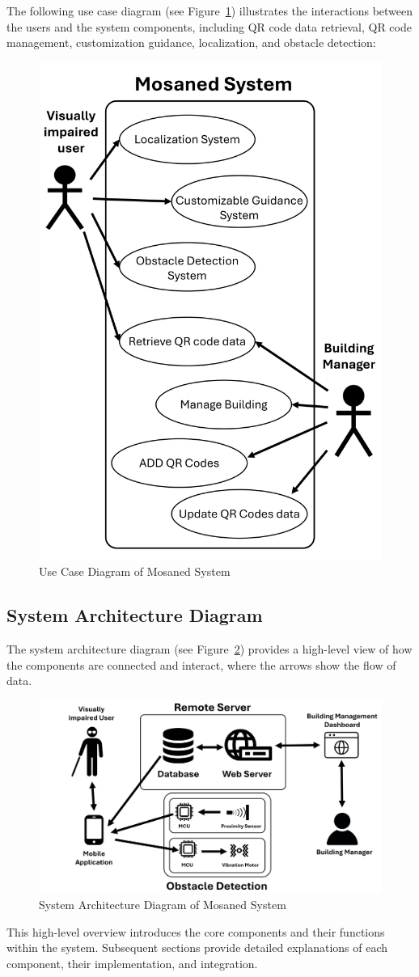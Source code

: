 The following use case diagram (see Figure~\ref{fig:use_case_diagram}) illustrates the interactions between the users and the system components, including QR code data retrieval, QR code management, customization guidance, localization, and obstacle detection:

\begin{figure}[h]
	\centering
	\includegraphics[width=0.6\linewidth]{assets/ch2/use_case}
	\caption{Use Case Diagram of Mosaned System}
	\label{fig:use_case_diagram}
\end{figure}

\subsection{System Architecture Diagram}

The system architecture diagram (see Figure~\ref{fig:system_architecture}) provides a high-level view of how the components are connected and interact, where the arrows show the flow of data. 

\begin{figure}[h]
	\centering
	\includegraphics[width=1\linewidth]{assets/ch2/sys_arch}
	\caption{System Architecture Diagram of Mosaned System}
	\label{fig:system_architecture}
\end{figure}

This high-level overview introduces the core components and their functions within the system. Subsequent sections provide detailed explanations of each component, their implementation, and integration.
